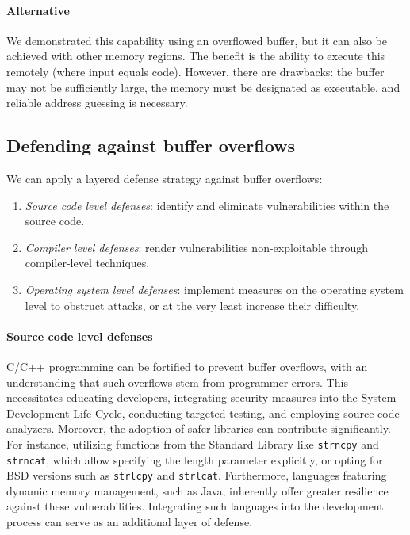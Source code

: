 \paragraph*{Alternative}
We demonstrated this capability using an overflowed buffer, but it can also be achieved with other memory regions.
The benefit is the ability to execute this remotely (where input equals code). 
However, there are drawbacks: the buffer may not be sufficiently large, the memory must be designated as executable, and reliable address guessing is necessary.

\subsection{Defending against buffer overflows}
We can apply a layered defense strategy against buffer overflows: 
\begin{enumerate}
    \item \textit{Source code level defenses}: identify and eliminate vulnerabilities within the source code.
    \item \textit{Compiler level defenses}: render vulnerabilities non-exploitable through compiler-level techniques.
    \item \textit{Operating system level defenses}: implement measures on the operating system level to obstruct attacks, or at the very least increase their difficulty.
\end{enumerate}

\paragraph*{Source code level defenses}
C/C++ programming can be fortified to prevent buffer overflows, with an understanding that such overflows stem from programmer errors. 
This necessitates educating developers, integrating security measures into the System Development Life Cycle, conducting targeted testing, and employing source code analyzers.
Moreover, the adoption of safer libraries can contribute significantly. 
For instance, utilizing functions from the Standard Library like \texttt{strncpy} and \texttt{strncat}, which allow specifying the length parameter explicitly, or opting for BSD versions such as \texttt{strlcpy} and \texttt{strlcat}.
Furthermore, languages featuring dynamic memory management, such as Java, inherently offer greater resilience against these vulnerabilities.
Integrating such languages into the development process can serve as an additional layer of defense.

